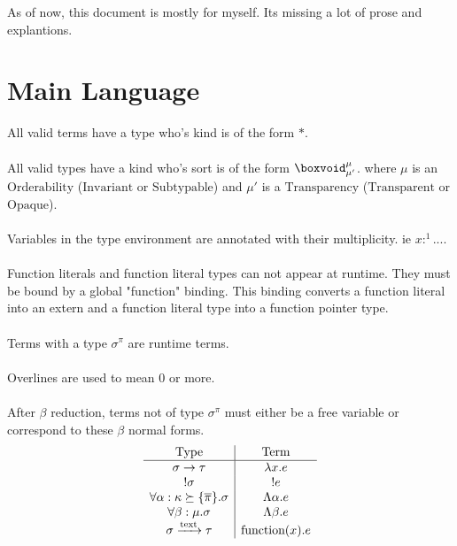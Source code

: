 \documentclass {article}
\begin{document}
As of now, this document is mostly for myself. Its missing a lot of prose and explantions. \\

\tableofcontents


\section{Main Language}
All valid terms have a type who's kind is of the form $ * $. \\
\\
All valid types have a kind who's sort is of the form $ \boxvoid^\mu_{\mu'} $.
where $ \mu $ is an $ \text{Orderability} $ ($\text{Invariant} $ or $ \text{Subtypable}$)
and $ \mu' $ is a $ \text{Transparency}$ ($\text{Transparent}$ or $\text{Opaque}$). \\
\\
Variables in the type environment are annotated with their multiplicity. ie $ x :^1 ... $. \\
\\
Function literals and function literal types can not appear at runtime. They must be bound by a global "function" binding.
This binding converts a function literal into an extern and a function literal type into a function pointer type. \\
\\
Terms with a type $ \sigma^\pi $ are runtime terms. \\
\\
Overlines are used to mean 0 or more. \\
\\
After $ \beta $ reduction, terms not of type $ \sigma^\pi $ must either be a free variable or correspond to these $ \beta $ normal forms. \\
\begin{gather*}
\begin{array}{c | c}
\text{Type} & \text{Term} \\
\hline
\sigma \to \tau & \lambda x. e \\
!\sigma & !e \\
\forall \alpha : \kappa \succeq \{ \overline \pi \}. \sigma & \Lambda \alpha. e  \\
\forall \beta : \mu. \sigma & \Lambda \beta. e \\
\sigma \xrightarrow{\text{text}} \tau & \text{function}(x). e \\
\end{array}
\\
\end{gather*}
\end{document}
